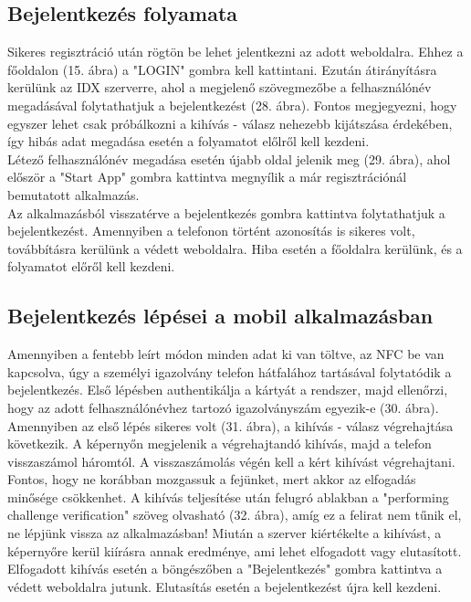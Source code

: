 \subsection{Bejelentkezés folyamata}
Sikeres regisztráció után rögtön be lehet jelentkezni az adott weboldalra. Ehhez a főoldalon (15. ábra) a "LOGIN" gombra kell kattintani. Ezután átirányításra kerülünk az IDX szerverre, ahol a megjelenő szövegmezőbe a felhasználónév megadásával folytathatjuk a bejelentkezést (28. ábra). Fontos megjegyezni, hogy egyszer lehet csak próbálkozni a kihívás - válasz nehezebb kijátszása érdekében, így hibás adat megadása esetén a folyamatot előlről kell kezdeni.
\\Létező felhasználónév megadása esetén újabb oldal jelenik meg (29. ábra), ahol először a "Start App" gombra kattintva megnyílik a már regisztrációnál bemutatott alkalmazás.
\\Az alkalmazásból visszatérve a bejelentkezés gombra kattintva folytathatjuk a bejelentkezést. Amennyiben a telefonon történt azonosítás is sikeres volt, továbbításra kerülünk a védett weboldalra. Hiba esetén a főoldalra kerülünk, és a folyamatot előről kell kezdeni.


\subsection{Bejelentkezés lépései a mobil alkalmazásban}
Amennyiben a fentebb leírt módon minden adat ki van töltve, az NFC be van kapcsolva, úgy a személyi igazolvány telefon hátfalához tartásával folytatódik a bejelentkezés. Első lépésben authentikálja a kártyát a rendszer, majd ellenőrzi, hogy az adott felhasználónévhez tartozó igazolványszám egyezik-e (30. ábra).
\\Amennyiben az első lépés sikeres volt (31. ábra), a kihívás - válasz végrehajtása következik. A képernyőn megjelenik a végrehajtandó kihívás, majd a telefon visszaszámol háromtól. A visszaszámolás végén kell a kért kihívást végrehajtani. Fontos, hogy ne korábban mozgassuk a fejünket, mert akkor az elfogadás minősége csökkenhet.
A kihívás teljesítése után felugró ablakban a "performing challenge verification" szöveg olvasható (32. ábra), amíg ez a felirat nem tűnik el, ne lépjünk vissza az alkalmazásban! Miután a szerver kiértékelte a kihívást, a képernyőre kerül kiírásra annak eredménye, ami lehet elfogadott vagy elutasított. Elfogadott kihívás esetén a böngészőben a "Bejelentkezés" gombra kattintva a védett weboldalra jutunk. Elutasítás esetén a bejelentkezést újra kell kezdeni.


